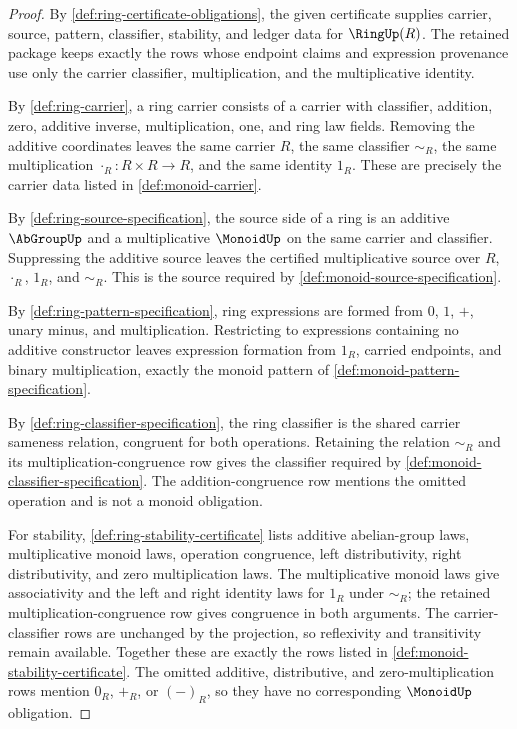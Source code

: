 \begin{proof}
By \autoref{def:ring-certificate-obligations}, the given certificate supplies carrier, source, pattern, classifier, stability, and ledger data for $\RingUp(R)$. The retained package keeps exactly the rows whose endpoint claims and expression provenance use only the carrier classifier, multiplication, and the multiplicative identity.

By \autoref{def:ring-carrier}, a ring carrier consists of a carrier with classifier, addition, zero, additive inverse, multiplication, one, and ring law fields. Removing the additive coordinates leaves the same carrier $R$, the same classifier $\sim_R$, the same multiplication $\cdot_R:R\times R\to R$, and the same identity $1_R$. These are precisely the carrier data listed in \autoref{def:monoid-carrier}.

By \autoref{def:ring-source-specification}, the source side of a ring is an additive $\AbGroupUp$ and a multiplicative $\MonoidUp$ on the same carrier and classifier. Suppressing the additive source leaves the certified multiplicative source over $R$, $\cdot_R$, $1_R$, and $\sim_R$. This is the source required by \autoref{def:monoid-source-specification}.

By \autoref{def:ring-pattern-specification}, ring expressions are formed from $0$, $1$, $+$, unary minus, and multiplication. Restricting to expressions containing no additive constructor leaves expression formation from $1_R$, carried endpoints, and binary multiplication, exactly the monoid pattern of \autoref{def:monoid-pattern-specification}.

By \autoref{def:ring-classifier-specification}, the ring classifier is the shared carrier sameness relation, congruent for both operations. Retaining the relation $\sim_R$ and its multiplication-congruence row gives the classifier required by \autoref{def:monoid-classifier-specification}. The addition-congruence row mentions the omitted operation and is not a monoid obligation.

For stability, \autoref{def:ring-stability-certificate} lists additive abelian-group laws, multiplicative monoid laws, operation congruence, left distributivity, right distributivity, and zero multiplication laws. The multiplicative monoid laws give associativity and the left and right identity laws for $1_R$ under $\sim_R$; the retained multiplication-congruence row gives congruence in both arguments. The carrier-classifier rows are unchanged by the projection, so reflexivity and transitivity remain available. Together these are exactly the rows listed in \autoref{def:monoid-stability-certificate}. The omitted additive, distributive, and zero-multiplication rows mention $0_R$, $+_R$, or $(-)_R$, so they have no corresponding $\MonoidUp$ obligation.


\end{proof}
